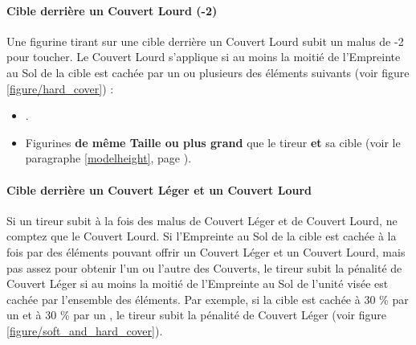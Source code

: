 \paragraph{Cible derrière un Couvert Lourd (-2)}

Une figurine tirant sur une cible derrière un Couvert Lourd subit un malus de -2 pour toucher. Le Couvert Lourd s'applique si au moins la moitié de l'Empreinte au Sol de la cible est cachée par un ou plusieurs des éléments suivants (voir figure \ref{figure/hard_cover}) :
\begin{itemize}[label={-}]
\item \hardterrain{}.
\item Figurines \textbf{de même Taille ou plus grand} que le tireur \textbf{et} sa cible (voir le paragraphe \ref{modelheight}, page \pageref{modelheight}).
\end{itemize}

\paragraph{Cible derrière un Couvert Léger et un Couvert Lourd}

Si un tireur subit à la fois des malus de Couvert Léger et de Couvert Lourd, ne comptez que le Couvert Lourd. Si l'Empreinte au Sol de la cible est cachée à la fois par des éléments pouvant offrir un Couvert Léger et un Couvert Lourd, mais pas assez pour obtenir l'un ou l'autre des Couverts, le tireur subit la pénalité de Couvert Léger si au moins la moitié de l'Empreinte au Sol de l'unité visée est cachée par l'ensemble des éléments. Par exemple, si la cible est cachée à 30 \% par un \softterrain{} et à 30 \% par un \hardterrain{}, le tireur subit la pénalité de Couvert Léger (voir figure \ref{figure/soft_and_hard_cover}).

\newcommand{\figureSCNotinlightofsight}{\normalfontsize{\textit{Pas de Ligne de Vue}}}
\newcommand{\figureSCA}{a)}
\newcommand{\figureSCB}{b)}
\newcommand{\figureSCC}{c)}
\newcommand{\figureSCWithinlightofsight}{\normalfontsize{\textit{Ligne de Vue !}}}
\newcommand{\figureSCLessthanhalfoffootprintobscured}{\normalfontsize{\textit{Moins de 50 \% cachée}}}
\newcommand{\figureSCMorethanhalfoffootprintobscured}{\normalfontsize{\textit{Plus de 50 \% cachée}}}

\vspace*{1.5cm}

